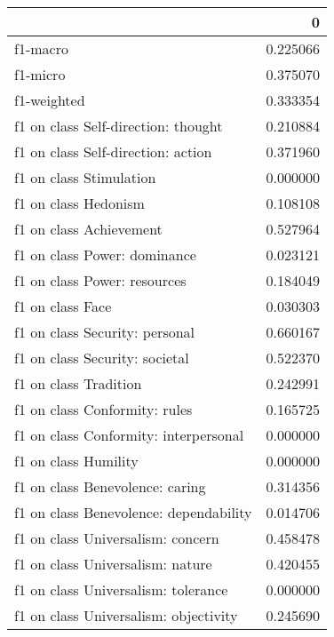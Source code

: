 \begin{tabular}{lr}
\toprule
{} &         0 \\
\midrule
f1-macro                               &  0.225066 \\
f1-micro                               &  0.375070 \\
f1-weighted                            &  0.333354 \\
f1 on class Self-direction: thought    &  0.210884 \\
f1 on class Self-direction: action     &  0.371960 \\
f1 on class Stimulation                &  0.000000 \\
f1 on class Hedonism                   &  0.108108 \\
f1 on class Achievement                &  0.527964 \\
f1 on class Power: dominance           &  0.023121 \\
f1 on class Power: resources           &  0.184049 \\
f1 on class Face                       &  0.030303 \\
f1 on class Security: personal         &  0.660167 \\
f1 on class Security: societal         &  0.522370 \\
f1 on class Tradition                  &  0.242991 \\
f1 on class Conformity: rules          &  0.165725 \\
f1 on class Conformity: interpersonal  &  0.000000 \\
f1 on class Humility                   &  0.000000 \\
f1 on class Benevolence: caring        &  0.314356 \\
f1 on class Benevolence: dependability &  0.014706 \\
f1 on class Universalism: concern      &  0.458478 \\
f1 on class Universalism: nature       &  0.420455 \\
f1 on class Universalism: tolerance    &  0.000000 \\
f1 on class Universalism: objectivity  &  0.245690 \\
\bottomrule
\end{tabular}
